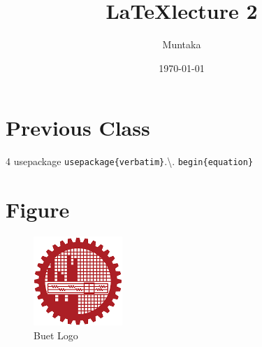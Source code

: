 \documentclass[14pt]{article}
\title{\LaTeX lecture 2}
\author{Muntaka}
\date{\today}
\begin{document}
	\maketitle
	\section{Previous Class}4
	usepackage \verb|usepackage{verbatim}|.\textbackslash.
	\verb|begin{equation}|
	
	
	\section{Figure}
	\begin{figure}[h]
		\centering
		\includegraphics[width=0.3\textwidth]{buetlogo.png}
		\caption{Buet Logo}
	\end{figure}
\end{document}
